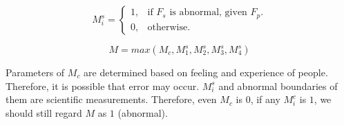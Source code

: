 \begin{equation}
  M_i^s=\begin{cases}
    1, & \text{if $F_s$ is abnormal, given $F_p$}.\\
    0, & \text{otherwise}.
  \end{cases}
\end{equation}

$$M=max(M_c,M_1^s,M_2^s,M_3^s,M_4^s)$$

Parameters of $M_c$ are determined based on feeling and experience of people. 
Therefore, it is possible that error may occur. 
$M_i^s$ and abnormal boundaries of them are scientific measurements. 
Therefore, even $M_c$ is $0$, if any $M_i^c$ is $1$, we should still regard $M$ as $1$ (abnormal). 
